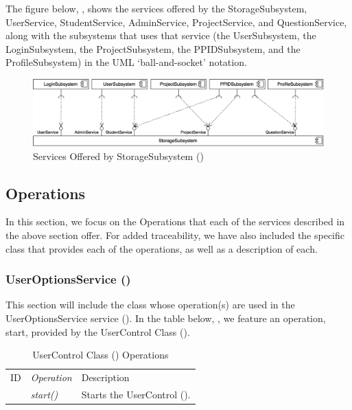 \documentclass[12pt,letterpaper]{article}
\begin{document}
The figure below, , shows the services offered by the StorageSubsystem, UserService, StudentService, AdminService, ProjectService, and QuestionService, along with the subsystems that uses that service (the UserSubsystem, the LoginSubsystem, the ProjectSubsystem, the PPIDSubsystem, and the ProfileSubsystem) in the UML `ball-and-socket' notation.

\begin{figure}[H]
	\centering{}
	\includegraphics[scale=0.27]{imgs/d3/services/storage-subsystem.png}
	\caption{Services Offered by StorageSubsystem ()}
\end{figure}

\subsection{Operations}

In this section, we focus on the Operations that each of the services described in the above section offer. For added traceability, we have also included the specific class that provides each of the operations, as well as a description of each.

\newpage{}
\subsubsection{UserOptionsService ()}

This section will include the class whose operation(s) are used in the UserOptionsService service (). In the table below, , we feature an operation, start, provided by the UserControl Class ().

\begin{table}[H]
	\caption{UserControl Class () Operations} 
	\begin{tabu} to 
		\tableheader{}ID & Operation & Description \\
         & start() & Starts the UserControl (). \\
	\end{tabu}
\end{table}
\end{document}
